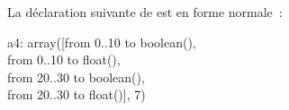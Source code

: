 \begin{example}

La déclaration suivante de  est en forme normale~:

\begin{pre}
a4: array([from  0..10 to boolean(), \\
           from  0..10 to float(), \\
           from 20..30 to boolean(), \\
           from 20..30 to float()], 7)
\end{pre}

\end{example}
